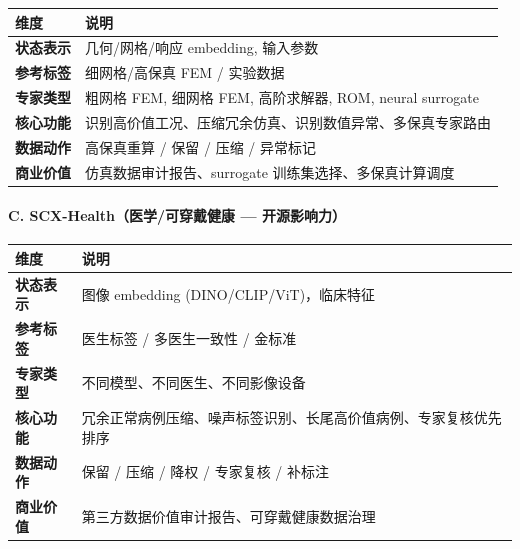 \documentclass[
  12pt,
]{ctexart}
\begin{document}
\begin{longtable}[]{@{}
  >{\raggedright\arraybackslash}p{}
  >{\raggedright\arraybackslash}p{}@{}}
\toprule\noalign{}
\begin{minipage}[b]{\linewidth}\raggedright
维度
\end{minipage} & \begin{minipage}[b]{\linewidth}\raggedright
说明
\end{minipage} \\
\midrule\noalign{}
\endhead
\bottomrule\noalign{}
\endlastfoot
\textbf{状态表示} & 几何/网格/响应 embedding, 输入参数 \\
\textbf{参考标签} & 细网格/高保真 FEM / 实验数据 \\
\textbf{专家类型} & 粗网格 FEM, 细网格 FEM, 高阶求解器, ROM, neural
surrogate \\
\textbf{核心功能} &
识别高价值工况、压缩冗余仿真、识别数值异常、多保真专家路由 \\
\textbf{数据动作} & 高保真重算 / 保留 / 压缩 / 异常标记 \\
\textbf{商业价值} & 仿真数据审计报告、surrogate
训练集选择、多保真计算调度 \\
\end{longtable}

\paragraph{C. SCX-Health（医学/可穿戴健康 ---
开源影响力）}\label{c.-scx-healthux533bux5b66ux53efux7a7fux6234ux5065ux5eb7-ux5f00ux6e90ux5f71ux54cdux529b}

\begin{longtable}[]{@{}
  >{\raggedright\arraybackslash}p{}
  >{\raggedright\arraybackslash}p{}@{}}
\toprule\noalign{}
\begin{minipage}[b]{\linewidth}\raggedright
维度
\end{minipage} & \begin{minipage}[b]{\linewidth}\raggedright
说明
\end{minipage} \\
\midrule\noalign{}
\endhead
\bottomrule\noalign{}
\endlastfoot
\textbf{状态表示} & 图像 embedding (DINO/CLIP/ViT)，临床特征 \\
\textbf{参考标签} & 医生标签 / 多医生一致性 / 金标准 \\
\textbf{专家类型} & 不同模型、不同医生、不同影像设备 \\
\textbf{核心功能} &
冗余正常病例压缩、噪声标签识别、长尾高价值病例、专家复核优先排序 \\
\textbf{数据动作} & 保留 / 压缩 / 降权 / 专家复核 / 补标注 \\
\textbf{商业价值} & 第三方数据价值审计报告、可穿戴健康数据治理 \\
\end{longtable}
\end{document}
